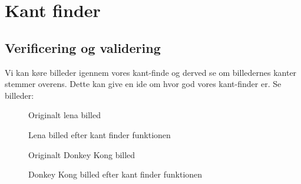 \section{Kant finder}
\subsection{Verificering og validering}
Vi kan køre billeder igennem vores kant-finde og derved se om billedernes kanter stemmer overens.
Dette kan give en ide om hvor god vores kant-finder er.
Se billeder:
\begin{figure}
\centering
{}
\caption{Originalt lena billed}
\end{figure}
\begin{figure}
\centering
{}
\caption{Lena billed efter kant finder funktionen}
\end{figure}
\begin{figure}
\centering
{}
\caption{Originalt Donkey Kong billed}
\end{figure}
\begin{figure}
\centering
{}
\caption{Donkey Kong billed efter kant finder funktionen}
\end{figure}


